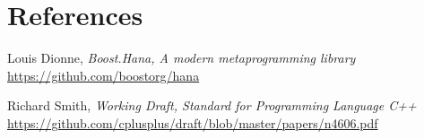 \documentclass[11pt]{article}
\begin{document}
\section{References}
\renewcommand{\section}[2]{}%
\begin{thebibliography}{9}

    Louis Dionne,
    \emph{Boost.Hana, A modern metaprogramming library}\newline
    \url{https://github.com/boostorg/hana}

    Richard Smith,
    \emph{Working Draft, Standard for Programming Language C++}\newline
    \url{https://github.com/cplusplus/draft/blob/master/papers/n4606.pdf}

\end{thebibliography}
\end{document}
